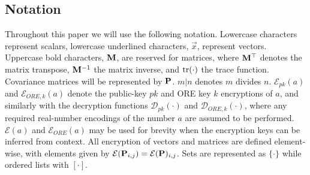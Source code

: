 \documentclass[letterpaper, 10 pt, conference]{ieeeconf}  %
\begin{document}
\subsection{Notation}
Throughout this paper we will use the following notation. Lowercase characters represent scalars, lowercase underlined characters, $\vec{x}$, represent vectors. Uppercase bold characters, ${{\mathbf{M}}}$, are reserved for matrices, where ${{\mathbf{M}}}^\top$ denotes the matrix transpose, ${{\mathbf{M}}}^{-1}$ the matrix inverse, and $\operatorname{tr}(\cdot)$ the trace function. Covariance matrices will be represented by ${{\mathbf{P}}}$. $m|n$ denotes $m$ divides $n$. $\mathcal{E}_{pk}(a)$ and $\mathcal{E}_{ORE,k}(a)$ denote the public-key $pk$ and ORE key $k$ encryptions of $a$, and similarly with the decryption functions $\mathcal{D}_{pk}(\cdot)$ and $\mathcal{D}_{ORE,k}(\cdot)$, where any required real-number encodings of the number $a$ are assumed to be performed. $\mathcal{E}(a)$ and $\mathcal{E}_{ORE}(a)$ may be used for brevity when the encryption keys can be inferred from context. All encryption of vectors and matrices are defined element-wise, with elements given by $\mathcal{E}({{\mathbf{P}}}_{i,j}) = \mathcal{E}({{\mathbf{P}}})_{i,j}$. Sets are represented as $\{\cdot\}$ while ordered lists with $[\cdot]$.

\end{document}
